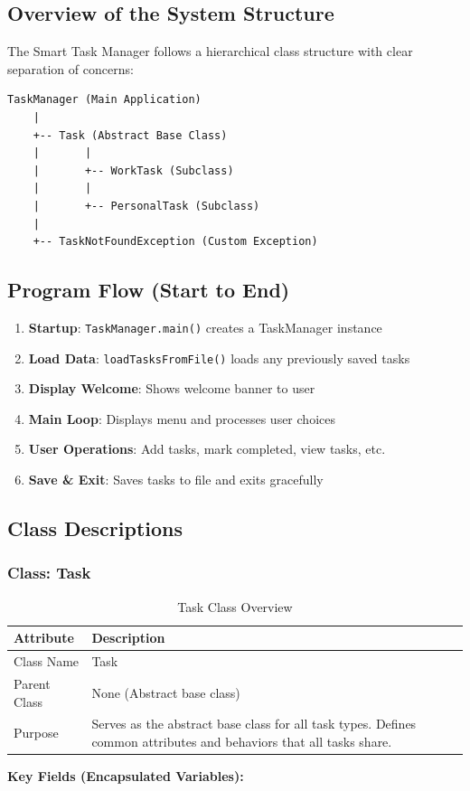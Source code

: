 \documentclass[12pt,a4paper]{article}
\begin{document}
\subsection{Overview of the System Structure}

The Smart Task Manager follows a hierarchical class structure with clear separation of concerns:

\begin{verbatim}
TaskManager (Main Application)
    |
    +-- Task (Abstract Base Class)
    |       |
    |       +-- WorkTask (Subclass)
    |       |
    |       +-- PersonalTask (Subclass)
    |
    +-- TaskNotFoundException (Custom Exception)
\end{verbatim}

\subsection{Program Flow (Start to End)}

\begin{enumerate}
    \item \textbf{Startup}: \texttt{TaskManager.main()} creates a TaskManager instance
    \item \textbf{Load Data}: \texttt{loadTasksFromFile()} loads any previously saved tasks
    \item \textbf{Display Welcome}: Shows welcome banner to user
    \item \textbf{Main Loop}: Displays menu and processes user choices
    \item \textbf{User Operations}: Add tasks, mark completed, view tasks, etc.
    \item \textbf{Save \& Exit}: Saves tasks to file and exits gracefully
\end{enumerate}

\subsection{Class Descriptions}

\subsubsection{Class: Task}

\begin{table}[H]
\centering
\begin{tabular}{|l|p{10cm}|}
\hline
\textbf{Attribute} & \textbf{Description} \\
\hline
Class Name & Task \\
\hline
Parent Class & None (Abstract base class) \\
\hline
Purpose & Serves as the abstract base class for all task types. Defines common attributes and behaviors that all tasks share. \\
\hline
\end{tabular}
\caption{Task Class Overview}
\end{table}
\newpage
\textbf{Key Fields (Encapsulated Variables):}
\end{document}

